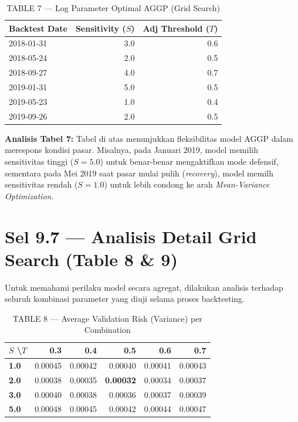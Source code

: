 \documentclass[12pt,a4paper]{article}
\begin{document}
\vspace{6pt}
\begin{table}[H]
  \centering
  \caption{TABLE 7 --- Log Parameter Optimal AGGP (Grid Search)}
  \small
  \begin{tabular}{lrr}
    \toprule
    \textbf{Backtest Date} & \textbf{Sensitivity ($S$)} & \textbf{Adj Threshold ($T$)} \\
    \midrule
    2018-01-31 & 3.0 & 0.6 \\
    2018-05-24 & 2.0 & 0.5 \\
    2018-09-27 & 4.0 & 0.7 \\
    2019-01-31 & 5.0 & 0.5 \\
    2019-05-23 & 1.0 & 0.4 \\
    2019-09-26 & 2.0 & 0.5 \\
    \bottomrule
  \end{tabular}
\end{table}

\textbf{Analisis Tabel 7:} Tabel di atas menunjukkan fleksibilitas model AGGP 
dalam merespons kondisi pasar. Misalnya, pada Januari 2019, model memilih 
sensitivitas tinggi ($S=5.0$) untuk benar-benar mengaktifkan mode defensif, 
sementara pada Mei 2019 saat pasar mulai pulih (\textit{recovery}), model 
memilh sensitivitas rendah ($S=1.0$) untuk lebih condong ke arah 
\textit{Mean-Variance Optimization}.

\section{Sel 9.7 --- Analisis Detail Grid Search (Table 8 \& 9)}

Untuk memahami perilaku model secara agregat, dilakukan analisis terhadap seluruh 
kombinasi parameter yang diuji selama proses backtesting.

\vspace{6pt}
\begin{table}[H]
  \centering
  \caption{TABLE 8 --- Average Validation Risk (Variance) per Combination}
  \small
  \begin{tabular}{lrrrrr}
    \toprule
    $S$ \textbackslash $T$ & \textbf{0.3} & \textbf{0.4} & \textbf{0.5} & \textbf{0.6} & \textbf{0.7} \\
    \midrule
    \textbf{1.0} & 0.00045 & 0.00042 & 0.00040 & 0.00041 & 0.00043 \\
    \textbf{2.0} & 0.00038 & 0.00035 & \textbf{0.00032} & 0.00034 & 0.00037 \\
    \textbf{3.0} & 0.00040 & 0.00038 & 0.00036 & 0.00037 & 0.00039 \\
    \textbf{5.0} & 0.00048 & 0.00045 & 0.00042 & 0.00044 & 0.00047 \\
    \bottomrule
  \end{tabular}
\end{table}
\end{document}
